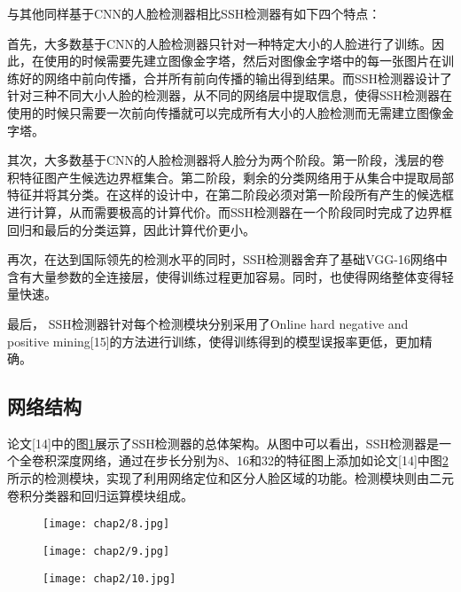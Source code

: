与其他同样基于CNN的人脸检测器相比SSH检测器有如下四个特点：

首先，大多数基于CNN的人脸检测器只针对一种特定大小的人脸进行了训练。因此，在使用的时候需要先建立图像金字塔，然后对图像金字塔中的每一张图片在训练好的网络中前向传播，合并所有前向传播的输出得到结果。而SSH检测器设计了针对三种不同大小人脸的检测器，从不同的网络层中提取信息，使得SSH检测器在使用的时候只需要一次前向传播就可以完成所有大小的人脸检测而无需建立图像金字塔。

其次，大多数基于CNN的人脸检测器将人脸分为两个阶段。第一阶段，浅层的卷积特征图产生候选边界框集合。第二阶段，剩余的分类网络用于从集合中提取局部特征并将其分类。在这样的设计中，在第二阶段必须对第一阶段所有产生的候选框进行计算，从而需要极高的计算代价。而SSH检测器在一个阶段同时完成了边界框回归和最后的分类运算，因此计算代价更小。

再次，在达到国际领先的检测水平的同时，SSH检测器舍弃了基础VGG-16网络中含有大量参数的全连接层，使得训练过程更加容易。同时，也使得网络整体变得轻量快速。

最后， SSH检测器针对每个检测模块分别采用了Online hard negative and positive mining[15]的方法进行训练，使得训练得到的模型误报率更低，更加精确。

\subsection{网络结构}

论文[14]中的图\ref{fig:ssh:arc}展示了SSH检测器的总体架构。从图中可以看出，SSH检测器是一个全卷积深度网络，通过在步长分别为8、16和32的特征图上添加如论文[14]中图\ref{fig:ssh:det}所示的检测模块，实现了利用网络定位和区分人脸区域的功能。检测模块则由二元卷积分类器和回归运算模块组成。

\begin{figure}[!htp]
	\centering
	\texttt{[image: chap2/8.jpg]}
	\label{fig:ssh:arc}
\end{figure}

\begin{figure}[!htp]
	\centering
	\texttt{[image: chap2/9.jpg]}
	\label{fig:ssh:det}
\end{figure}

\begin{figure}[!htp]
	\centering
	\texttt{[image: chap2/10.jpg]}
	\label{fig:ssh:context}
\end{figure}

